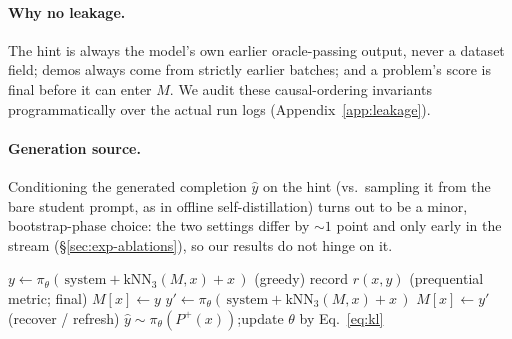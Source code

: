 \paragraph{Why no leakage.} The hint is always the model's own earlier
oracle-passing output, never a dataset field; demos always come from strictly
earlier batches; and a problem's score is final before it can enter $M$. We audit
these causal-ordering invariants programmatically over the actual run logs
(Appendix~\ref{app:leakage}).

\paragraph{Generation source.} Conditioning the generated completion $\hat y$ on
the hint (vs.\ sampling it from the bare student prompt, as in offline
self-distillation) turns out to be a minor, bootstrap-phase choice: the two
settings differ by ${\sim}1$ point and only early in the stream
(\S\ref{sec:exp-ablations}), so our results do not hinge on it.

\begin{algorithm}[t]
\caption{\method{} (one stream batch)}
\label{alg:method}
\begin{algorithmic}[1]
  \STATE $y \leftarrow \pi_\theta(\,\text{system} + \text{kNN}_3(M, x) + x\,)$ \hfill (greedy)
  \STATE record $r(x,y)$ \hfill (prequential metric; final)
   \STATE $M[x] \leftarrow y$ \ENDIF
\ENDFOR
{}
  \STATE $y' \leftarrow \pi_\theta(\,\text{system} + \text{kNN}_3(M, x) + x\,)$
   \STATE $M[x] \leftarrow y'$ \hfill (recover / refresh) \ENDIF
\ENDFOR
{}
  \STATE $\hat y \sim \pi_\theta(P^{+}(x))$;\quad update $\theta$ by Eq.~\ref{eq:kl}
\ENDFOR
\end{algorithmic}
\end{algorithm}
